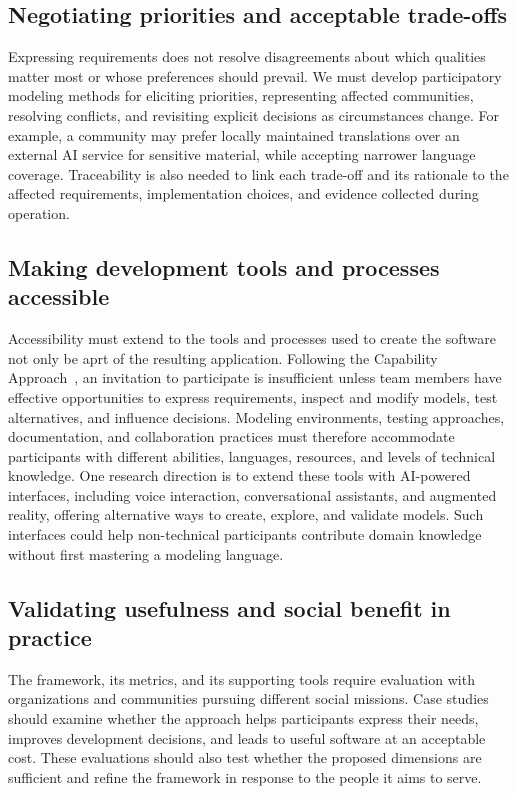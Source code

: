 \documentclass[11pt,a4paper]{article}
\begin{document}
\subsection{Negotiating priorities and acceptable trade-offs}

Expressing requirements does not resolve disagreements about which qualities matter most or whose preferences should prevail.
We must develop participatory modeling methods for eliciting priorities, representing affected communities, resolving conflicts, and revisiting explicit decisions as circumstances change.
For example, a community may prefer locally maintained translations over an external AI service for sensitive material, while accepting narrower language coverage.
Traceability is also needed to link each trade-off and its rationale to the affected requirements, implementation choices, and evidence collected during operation.

\subsection{Making development tools and processes accessible}

Accessibility must extend to the tools and processes used to create the software not only be aprt of the resulting application.
Following the Capability Approach~\cite{Nussbaum2003Capabilities}, an invitation to participate is insufficient unless team members have effective opportunities to express requirements, inspect and modify models, test alternatives, and influence decisions.
Modeling environments, testing approaches, documentation, and collaboration practices must therefore accommodate participants with different abilities, languages, resources, and levels of technical knowledge.
One research direction is to extend these tools with AI-powered interfaces, including voice interaction, conversational assistants, and augmented reality, offering alternative ways to create, explore, and validate models.
Such interfaces could help non-technical participants contribute domain knowledge without first mastering a modeling language.


\subsection{Validating usefulness and social benefit in practice}

The framework, its metrics, and its supporting tools require evaluation with organizations and communities pursuing different social missions.
Case studies should examine whether the approach helps participants express their needs, improves development decisions, and leads to useful software at an acceptable cost.
These evaluations should also test whether the proposed dimensions are sufficient and refine the framework in response to the people it aims to serve.

\nocite{*}


\end{document}
